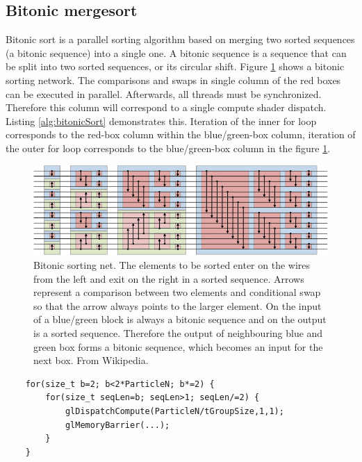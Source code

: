 \documentclass[a4paper,report]{IEEEtran}
\begin{document}
\subsection{Bitonic mergesort}
Bitonic sort is a parallel sorting algorithm based on merging two sorted sequences (a bitonic sequence) into a single one. A bitonic sequence is a sequence that can be split into two sorted sequences, or its circular shift. Figure \ref{fig:bitonicSort} shows a bitonic sorting network. The comparisons and swaps in single column of the red boxes can be executed in parallel. Afterwards, all threads must be synchronized. Therefore this column will correspond to a single compute shader dispatch. Listing \ref{alg:bitonicSort} demonstrates this. Iteration of the inner for loop corresponds to the red-box column within the blue/green-box column, iteration of the outer for loop corresponds to the blue/green-box column in the figure \ref{fig:bitonicSort}.
\begin{figure}[!h]
\centering
\includegraphics[width=\textwidth]{BitonicSort}
\caption{Bitonic sorting net. The elements to be sorted enter on the wires from the left and exit on the right in a sorted sequence. Arrows represent a comparison between two elements and conditional swap so that the arrow always points to the larger element. On the input of a blue/green block is always a bitonic sequence and on the output is a sorted sequence. Therefore the output of neighbouring blue and green box forms a bitonic sequence, which becomes an input for the next box. From Wikipedia.}
\label{fig:bitonicSort}
\end{figure}

\lstset{language=C++,caption=Calls to the bitonic sort kernel,frame=single,label=alg:bitonicSort,captionpos=b,basicstyle= \footnotesize,tabsize=1} 
\begin{lstlisting}
	for(size_t b=2; b<2*ParticleN; b*=2) {
		for(size_t seqLen=b; seqLen>1; seqLen/=2) {
			glDispatchCompute(ParticleN/tGroupSize,1,1);
			glMemoryBarrier(...);
		}
	}
\end{lstlisting} 
\end{document}
